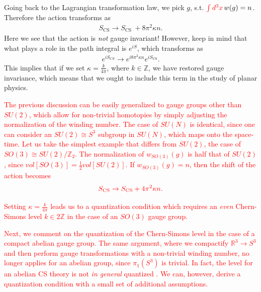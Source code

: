     Going back to the Lagrangian transformation law, we pick $g$, s.t. $\textcolor{red}{\int d^3 x} \,w(g)=n$. Therefore the action transforms as
    \begin{align}
        S_{\text{CS}} \rightarrow S_{\text{CS } }+ 8 \pi^2 \kappa n.
    \end{align}
    Here we see that the action is \textit{not} gauge invariant! However, keep in mind that what plays a role in the path integral is $e^{i S}$, which transforms as
    \begin{align}
        e^{i S_{CS}} \rightarrow e^{i 8 \pi^2 \kappa n} e^{i S_{\text{CS}}}.
    \end{align}
    This implies that if we set $\kappa = \frac{k}{4 \pi}$, where $k\in \mathbb{Z}$, we have restored gauge invariance, which means that we ought to include this term in the study of planar physics.

    \textcolor{red}{The previous discussion can be easily generalized to gauge groups other than $SU(2)$, which allow for non-trivial homotopies by simply adjusting the normalization of the winding number. The case of $SU(N)$ is identical, since one can consider an $SU(2) \cong S^3$ subgroup in $SU(N)$, which maps onto the space-time. Let us take the simplest example that differs from $SU(2)$, the case of $SO(3)\cong SU(2)/ \mathbb{Z}_2$. The normalization of $w_{SO(3)}(g)$ is half that of $SU(2)$, since $vol[SO(3)] = \frac{1}{2} vol[SU(2)]$. If $w_{SO(3)}(g)=n$, then the shift of the action becomes }
\begin{align}
    \textcolor{red}{S_{\text{CS}} \rightarrow S_{\text{CS}}+ 4\pi^2 \kappa n.}
\end{align}

\textcolor{red}{Setting $\kappa = \frac{k}{4 \pi}$ leads us to a quantization condition which requires an \textit{even} Chern-Simons level $k \in 2\mathbb{Z}$ in the case of an $SO(3)$ gauge group.}

\textcolor{red}{Next, we comment on the quantization of the Chern-Simons level in the case of a compact abelian gauge group. The same argument, where we compactify $\mathbb{R}^3 \rightarrow S^{3}$ and then perform gauge transformations with a non-trivial winding number, no longer applies for an abelian group, since $\pi_1(S^3)$ is trivial. In fact, the level for an abelian CS theory is not \textit{in general} quantized \cite{Polychronakos:1990xq}. We can, however, derive a quantization condition with a small set of additional assumptions.}

